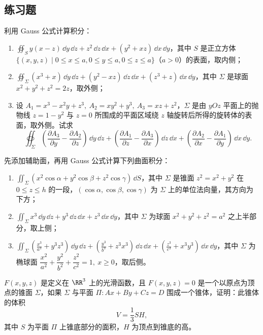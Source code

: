 \subsection{练习题}

\begin{xexercise}[1]
利用 Gauss 公式计算积分：
\begin{enumerate}[label=(\arabic*)]
\item $\displaystyle\oiint_S y(x-z)\,\dd y\,\dd z+z^2\,\dd z\,\dd x+(y^2+xz)\,\dd x\,\dd y$，其中 $S$ 是正立方体 $\{(x,y,z)\mid0\le x\le a,0\le y\le a,0\le z\le a\}$（$a>0$）的表面，取内侧；
\item $\displaystyle\oiint_\Sigma(x^3+x)\,\dd y\,\dd z+(y^2-xz)\,\dd z\,\dd x+(z^3+z)\,\dd x\,\dd y$，其中 $\Sigma$ 是球面 $x^2+y^2+z^2=2z$，取外侧；
\item 设 $A_1=x^3-x^2y+z^3,\ A_2=xy^2+y^3,\ A_3=xz+z^2$，$\Sigma$ 是由 $yOz$ 平面上的抛物线 $z=1-y^2$ 与 $z=0$ 所围成的平面区域绕 $z$ 轴旋转后所得的旋转体的表面，取外侧。试求
\[
  \oiint_\Sigma\left(\frac{\partial A_3}{\partial y}-\frac{\partial A_2}{\partial z}\right)\,\dd y\,\dd z
  +\left(\frac{\partial A_1}{\partial z}-\frac{\partial A_3}{\partial x}\right)\,\dd z\,\dd x
  +\left(\frac{\partial A_2}{\partial x}-\frac{\partial A_1}{\partial y}\right)\,\dd x\,\dd y.
\]
\end{enumerate}
\end{xexercise}

\begin{xexercise}[2]
先添加辅助面，再用 Gauss 公式计算下列曲面积分：
\begin{enumerate}[label=(\arabic*)]
\item $\displaystyle\iint_\Sigma(x^2\cos\alpha+y^2\cos\beta+z^2\cos\gamma)\,\dd S$，其中 $\Sigma$ 是锥面 $z^2=x^2+y^2$ 在 $0\le z\le h$ 的一段，$(\cos\alpha,\cos\beta,\cos\gamma)$ 为 $\Sigma$ 上的单位法向量，其方向为下方；
\item $\displaystyle\iint_\Sigma x^3\,\dd y\,\dd z+y^3\,\dd z\,\dd x+z^3\,\dd x\,\dd y$，其中 $\Sigma$ 为球面 $x^2+y^2+z^2=a^2$ 之上半部分，取上侧；
\item $\displaystyle\iint_\Sigma\left(\frac{x^3}{a^3}+y^3z^3\right)\,\dd y\,\dd z+
\left(\frac{y^3}{b^3}+z^3x^3\right)\,\dd z\,\dd x+
\left(\frac{z^3}{c^3}+x^3y^3\right)\,\dd x\,\dd y$，其中 $\Sigma$ 为椭球面 $\dfrac{x^2}{a^2}+\dfrac{y^2}{b^2}+\dfrac{z^2}{c^2}=1,\ x\ge0$，取后侧。
\end{enumerate}
\end{xexercise}

\begin{xexercise}[3]
$F(x,y,z)$ 是定义在 $\RR^3$ 上的光滑函数，且 $F(x,y,z)=0$ 是一个以原点为顶点的锥面 $\Sigma$，如果 $\Sigma$ 与平面 $\Pi:Ax+By+Cz=D$ 围成一个锥体，证明：此锥体的体积
\[
  V=\frac13SH,
\]
其中 $S$ 为平面 $\Pi$ 上锥底部分的面积，$H$ 为顶点到锥底的高。
\end{xexercise}

